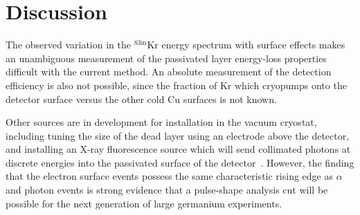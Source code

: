 \documentclass[nofootinbib,superscriptaddress, aps, prc, 
10pt, amsmath, amssymb, bibnotes,
altaffilletter, twocolumn, floatfix]{revtex4-2}
\def\kr83{{${}^{83\mathrm{m}}$Kr}}
\begin{document}


    

\section{Discussion}

    The observed variation in the \kr83 energy spectrum with surface effects makes an unambiguous measurement of the passivated layer energy-loss properties difficult with the current method.
    An absolute measurement of the detection efficiency is also not possible, since the fraction of Kr which cryopumps onto the detector surface versus the other cold Cu surfaces is not known.

    Other sources are in development for installation in the vacuum cryostat, including tuning the size of the dead layer using an electrode above the detector, and installing an X-ray fluorescence source which will send collimated photons at discrete energies into the passivated surface of the detector~\cite{elliott2023xrf}.
    However, the finding that the electron surface events possess the same characteristic rising edge as $\alpha$ and photon events is strong evidence that a pulse-shape analysis cut will be possible for the next generation of large germanium experiments.
\end{document}
